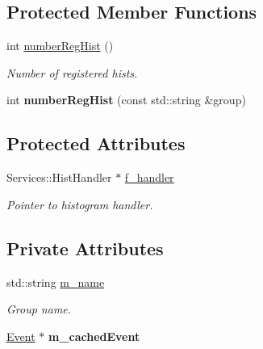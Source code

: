 \subsection*{Protected Member Functions}
\begin{CompactItemize}
\item 
\hypertarget{classHistGroupBase_f61d809265c59ae9469611a3d5346a3b}{
int \hyperlink{classHistGroupBase_f61d809265c59ae9469611a3d5346a3b}{number\-Reg\-Hist} ()}
\label{classHistGroupBase_f61d809265c59ae9469611a3d5346a3b}

\begin{CompactList}\small\item\em Number of registered hists. \item\end{CompactList}\item 
\hypertarget{classHistGroupBase_ad84aed9b441c80173f3eb5f3ea4cadb}{
int \textbf{number\-Reg\-Hist} (const std::string \&group)}
\label{classHistGroupBase_ad84aed9b441c80173f3eb5f3ea4cadb}

\end{CompactItemize}
\subsection*{Protected Attributes}
\begin{CompactItemize}
\item 
\hypertarget{classHistGroupBase_12a9be7ce02896ca29eac36e53af63e2}{
Services::Hist\-Handler $\ast$ \hyperlink{classHistGroupBase_12a9be7ce02896ca29eac36e53af63e2}{f\_\-handler}}
\label{classHistGroupBase_12a9be7ce02896ca29eac36e53af63e2}

\begin{CompactList}\small\item\em Pointer to histogram handler. \item\end{CompactList}\end{CompactItemize}
\subsection*{Private Attributes}
\begin{CompactItemize}
\item 
\hypertarget{classHistGroupBase_2fd28be1215535996d874ee67801516a}{
std::string \hyperlink{classHistGroupBase_2fd28be1215535996d874ee67801516a}{m\_\-name}}
\label{classHistGroupBase_2fd28be1215535996d874ee67801516a}

\begin{CompactList}\small\item\em Group name. \item\end{CompactList}\item 
\hypertarget{classHistGroupBase_315f593cd693b13e3a98bdfb3e4e3685}{
\hyperlink{classEvent}{Event} $\ast$ \textbf{m\_\-cached\-Event}}
\label{classHistGroupBase_315f593cd693b13e3a98bdfb3e4e3685}

\end{CompactItemize}


